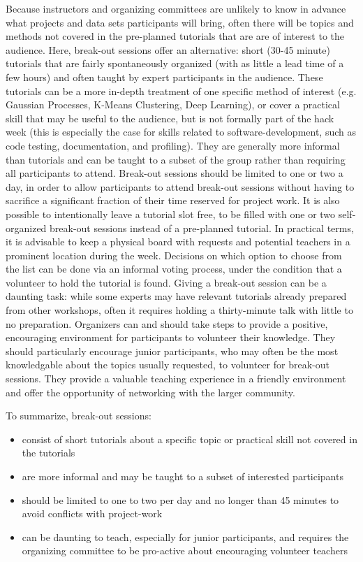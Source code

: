 Because instructors and organizing committees are unlikely to know in advance what projects and data sets participants will bring, often there will be topics and methods not covered in the pre-planned tutorials that are are of interest to the audience. Here, break-out sessions offer an alternative: short (30-45 minute) tutorials that are fairly spontaneously organized (with as little a lead time of a few hours) and often taught by expert participants in the audience. These tutorials can be a more in-depth treatment of one specific method of interest (e.g. Gaussian Processes, K-Means Clustering, Deep Learning), or cover a practical skill that may be useful to the audience, but is not formally part of the hack week (this is especially the case for skills related to software-development, such as code testing, documentation, and profiling). They are generally more informal than tutorials and can be taught to a subset of the group rather than requiring all participants to attend.
Break-out sessions should be limited to one or two a day, in order to allow participants to attend break-out sessions without having to sacrifice a significant fraction of their time reserved for project work. It is also possible to intentionally leave a tutorial slot free, to be filled with one or two self-organized break-out sessions instead of a pre-planned tutorial. In practical terms, it is advisable to keep a physical board with requests and potential teachers in a prominent location during the week. Decisions on which option to choose from the list can be done via an informal voting process, under the condition that a volunteer to hold the tutorial is found. Giving a break-out session can be a daunting task: while some experts may have relevant tutorials already prepared from other workshops, often it requires holding a thirty-minute talk with little to no preparation. Organizers can and should take steps to provide a positive, encouraging environment for participants to volunteer their knowledge. They should particularly encourage junior participants, who may often be the most knowledgable about the topics usually requested, to volunteer for break-out sessions. They provide a valuable teaching experience in a friendly environment and offer the opportunity of networking with the larger community.

To summarize, break-out sessions:
\begin{itemize}
\item consist of short tutorials about a specific topic or practical skill not covered in the tutorials
\item are more informal and may be taught to a subset of interested participants
\item should be limited to one to two per day and no longer than 45 minutes to avoid conflicts with project-work
\item can be daunting to teach, especially for junior participants, and requires the organizing committee to be pro-active about encouraging volunteer teachers
\end{itemize}

